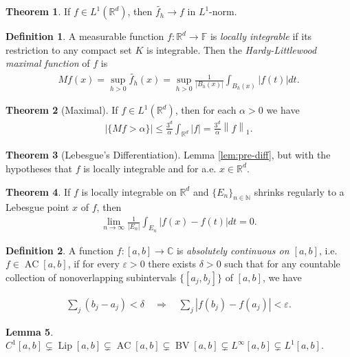 \documentclass[a4paper,9pt]{extarticle}
\newcommand{\norm}[1]{\left\lVert#1\right\rVert}
\DeclareMathOperator*{\BV}{BV}
\DeclareMathOperator*{\Lip}{Lip}
\DeclareMathOperator*{\AC}{AC}
\theoremstyle{definition}
\newtheorem{defin}{Definition}
\newtheorem{thm}{Theorem}
\newtheorem{lem}[thm]{Lemma}
\begin{document}
\begin{thm}
    If $f \in L^1(\mathbb{R}^d)$, then $\tilde{f_h} \to f$ in $L^1$-norm.
\end{thm}
\begin{defin}
    A measurable function $f : \mathbb{R}^d \to \mathbb{F}$ is \emph{locally integrable} if its restriction to any compact set $K$ is integrable. Then the \emph{Hardy-Littlewood maximal function} of $f$ is
    \begin{align*}
        Mf(x) = \sup_{h > 0} \tilde{f_h}(x) = \sup_{h > 0} \frac{1}{|B_h(x)|} \int_{B_h(x)} |f(t)| dt.
    \end{align*}
\end{defin}
\begin{thm}[Maximal]
    If $f \in L^1(\mathbb{R}^d)$, then for each $\alpha > 0$ we have
    \begin{align*}
        |\{ Mf > \alpha \}| \leq \frac{3^d}{\alpha} \int_{\mathbb{R}^d} |f| = \frac{3^d}{\alpha} \norm{f}_1.
    \end{align*}
\end{thm}
\begin{thm}[Lebesgue's Differentiation]
    Lemma \ref{lem:pre-diff}, but with the hypotheses that $f$ is locally integrable and for a.e. $x \in \mathbb{R}^d$.
\end{thm}
\begin{thm}
    If $f$ is locally integrable on $\mathbb{R}^d$ and $\{ E_n \}_{n \in \mathbb{N}}$ shrinks regularly to a Lebesgue point $x$ of $f$, then
    \begin{align*}
        \lim_{n \to \infty} \frac{1}{|E_n|} \int_{E_n} |f(x) - f(t)| dt = 0.
    \end{align*}
\end{thm}
\begin{defin}
    A function $f : [a, b] \to \mathbb{C}$ is \emph{absolutely continuous on $[a, b]$}, i.e. $f \in \AC[a, b]$, if for every $\varepsilon > 0$ there exists $\delta > 0$ such that for any countable collection of nonoverlapping subintervals $\{[a_j, b_j]\}$ of $[a, b]$, we have
\end{defin}
\begin{align*}
    \sum_j (b_j - a_j) < \delta
    \quad \Longrightarrow \quad
    \sum_j |f(b_j) - f(a_j)| < \varepsilon.
\end{align*}
\begin{lem}
    $C^1[a, b] \subsetneq \Lip[a, b] \subsetneq \AC[a, b] \subsetneq \BV[a, b] \subsetneq L^\infty[a, b] \subsetneq L^1[a, b]$.
\end{lem}
\end{document}
